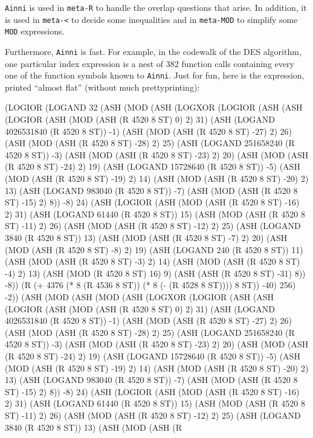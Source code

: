 \documentclass[submission,copyright,creativecommons]{eptcs}
\newcommand{\ptt}[1]{\tt{#1}}
\begin{document}
{\ptt{Ainni}} is used in {\ptt{meta-R}} to handle the overlap questions that
arise.  In addition, it is used in {\ptt{meta-<}} to decide some inequalities and in {\ptt{meta-MOD}}
to simplify some {\ptt{MOD}} expressions.

Furthermore, {\ptt{Ainni}} is fast.  For example, in the codewalk of the DES algorithm,
one particular index expression is a nest of 382 function calls containing
every one of the function symbols known to {\ptt{Ainni}}.  Just for fun, here is
the expression, printed ``almost flat'' (without much prettyprinting):
\vspace{0.5em}
\begin{acl2p}{\tiny{
(LOGIOR
  (LOGAND 32 (ASH (MOD (ASH (LOGXOR (LOGIOR (ASH (ASH (LOGIOR (ASH (MOD (ASH (R 4520 8 ST) 0) 2) 31) (ASH (LOGAND 4026531840
    (R 4520 8 ST)) -1) (ASH (MOD (ASH (R 4520 8 ST) -27) 2) 26) (ASH (MOD (ASH (R 4520 8 ST) -28) 2) 25) (ASH (LOGAND 251658240 (R 4520
    8 ST)) -3) (ASH (MOD (ASH (R 4520 8 ST) -23) 2) 20) (ASH (MOD (ASH (R 4520 8 ST) -24) 2) 19) (ASH (LOGAND 15728640 (R 4520 8 ST))
    -5) (ASH (MOD (ASH (R 4520 8 ST) -19) 2) 14) (ASH (MOD (ASH (R 4520 8 ST) -20) 2) 13) (ASH (LOGAND 983040 (R 4520 8 ST)) -7) (ASH
    (MOD (ASH (R 4520 8 ST) -15) 2) 8)) -8) 24) (ASH (LOGIOR (ASH (MOD (ASH (R 4520 8 ST) -16) 2) 31) (ASH (LOGAND 61440 (R 4520 8 ST))
    15) (ASH (MOD (ASH (R 4520 8 ST) -11) 2) 26) (ASH (MOD (ASH (R 4520 8 ST) -12) 2) 25) (ASH (LOGAND 3840 (R 4520 8 ST)) 13) (ASH (MOD
    (ASH (R 4520 8 ST) -7) 2) 20) (ASH (MOD (ASH (R 4520 8 ST) -8) 2) 19) (ASH (LOGAND 240 (R 4520 8 ST)) 11) (ASH (MOD (ASH (R 4520 8
    ST) -3) 2) 14) (ASH (MOD (ASH (R 4520 8 ST) -4) 2) 13) (ASH (MOD (R 4520 8 ST) 16) 9) (ASH (ASH (R 4520 8 ST) -31) 8)) -8)) (R (+
    4376 (* 8 (R 4536 8 ST)) (* 8 (- (R 4528 8 ST)))) 8 ST)) -40) 256) -2))
  (ASH (MOD (ASH (MOD (ASH (LOGXOR (LOGIOR (ASH (ASH (LOGIOR (ASH (MOD (ASH (R 4520 8 ST) 0) 2) 31) (ASH (LOGAND 4026531840 (R 4520
    8 ST)) -1) (ASH (MOD (ASH (R 4520 8 ST) -27) 2) 26) (ASH (MOD (ASH (R 4520 8 ST) -28) 2) 25) (ASH (LOGAND 251658240 (R 4520 8 ST))
    -3) (ASH (MOD (ASH (R 4520 8 ST) -23) 2) 20) (ASH (MOD (ASH (R 4520 8 ST) -24) 2) 19) (ASH (LOGAND 15728640 (R 4520 8 ST)) -5) (ASH
    (MOD (ASH (R 4520 8 ST) -19) 2) 14) (ASH (MOD (ASH (R 4520 8 ST) -20) 2) 13) (ASH (LOGAND 983040 (R 4520 8 ST)) -7) (ASH (MOD (ASH
    (R 4520 8 ST) -15) 2) 8)) -8) 24) (ASH (LOGIOR (ASH (MOD (ASH (R 4520 8 ST) -16) 2) 31) (ASH (LOGAND 61440 (R 4520 8 ST)) 15) (ASH
    (MOD (ASH (R 4520 8 ST) -11) 2) 26) (ASH (MOD (ASH (R 4520 8 ST) -12) 2) 25) (ASH (LOGAND 3840 (R 4520 8 ST)) 13) (ASH (MOD (ASH (R
}}
\end{acl2p}
\end{document}
